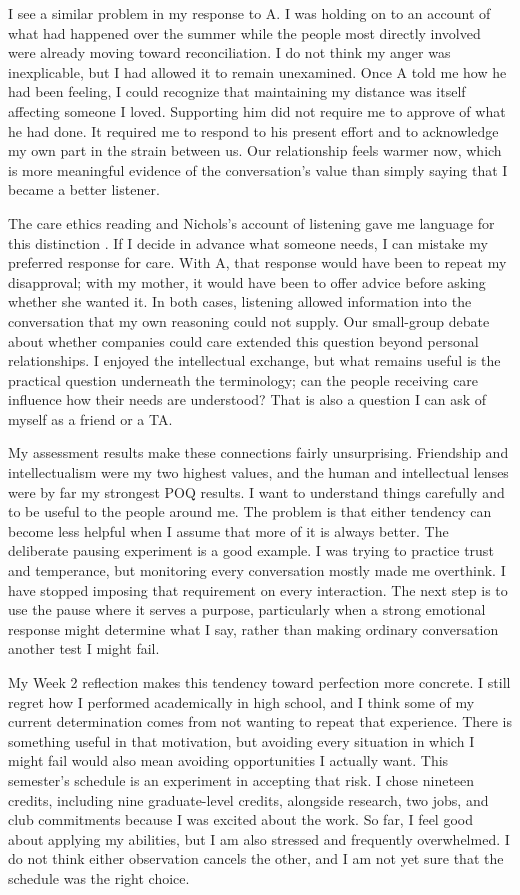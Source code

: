 \documentclass[12pt,stu,biblatex]{apa7}
\begin{document}
I see a similar problem in my response to A.
I was holding on to an account of what had happened over the summer while the people most directly involved were already moving toward reconciliation.
I do not think my anger was inexplicable, but I had allowed it to remain unexamined.
Once A told me how he had been feeling, I could recognize that maintaining my distance was itself affecting someone I loved.
Supporting him did not require me to approve of what he had done.
It required me to respond to his present effort and to acknowledge my own part in the strain between us.
Our relationship feels warmer now, which is more meaningful evidence of the conversation's value than simply saying that I became a better listener.

The care ethics reading and Nichols's account of listening gave me language for this distinction \parencite{engsterHamington2015introduction,nichols2009listening}.
If I decide in advance what someone needs, I can mistake my preferred response for care.
With A, that response would have been to repeat my disapproval; with my mother, it would have been to offer advice before asking whether she wanted it.
In both cases, listening allowed information into the conversation that my own reasoning could not supply.
Our small-group debate about whether companies could care extended this question beyond personal relationships.
I enjoyed the intellectual exchange, but what remains useful is the practical question underneath the terminology; can the people receiving care influence how their needs are understood?
That is also a question I can ask of myself as a friend or a TA.

My assessment results make these connections fairly unsurprising.
Friendship and intellectualism were my two highest values, and the human and intellectual lenses were by far my strongest POQ results.
I want to understand things carefully and to be useful to the people around me.
The problem is that either tendency can become less helpful when I assume that more of it is always better.
The deliberate pausing experiment is a good example.
I was trying to practice trust and temperance, but monitoring every conversation mostly made me overthink.
I have stopped imposing that requirement on every interaction.
The next step is to use the pause where it serves a purpose, particularly when a strong emotional response might determine what I say, rather than making ordinary conversation another test I might fail.

My Week 2 reflection makes this tendency toward perfection more concrete.
I still regret how I performed academically in high school, and I think some of my current determination comes from not wanting to repeat that experience.
There is something useful in that motivation, but avoiding every situation in which I might fail would also mean avoiding opportunities I actually want.
This semester's schedule is an experiment in accepting that risk.
I chose nineteen credits, including nine graduate-level credits, alongside research, two jobs, and club commitments because I was excited about the work.
So far, I feel good about applying my abilities, but I am also stressed and frequently overwhelmed.
I do not think either observation cancels the other, and I am not yet sure that the schedule was the right choice.
\end{document}

